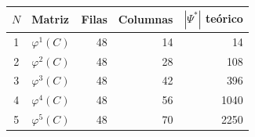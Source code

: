 \begin{tabular}{c l r r r}
\toprule
$N$ & Matriz & Filas & Columnas & $|\Psi^*|$ teórico \\
\midrule
1 & $\varphi^{1}(C)$ & 48 & 14 & 14 \\
2 & $\varphi^{2}(C)$ & 48 & 28 & 108 \\
3 & $\varphi^{3}(C)$ & 48 & 42 & 396 \\
4 & $\varphi^{4}(C)$ & 48 & 56 & 1040 \\
5 & $\varphi^{5}(C)$ & 48 & 70 & 2250 \\
\bottomrule
\end{tabular}
